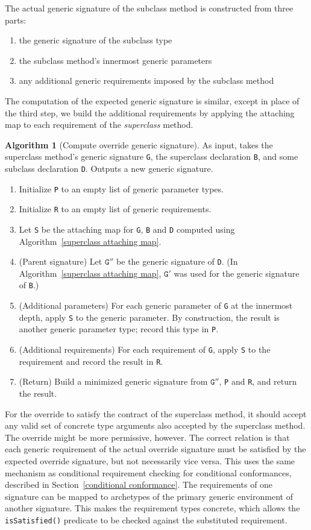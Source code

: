 \documentclass[a4paper,headsepline,bibliography=totoc,toc=flat,fleqn,twoside=semi]{scrbook}
\theoremstyle{definition}
\theoremstyle{definition}
\theoremstyle{definition}
\newtheorem{algorithm}{Algorithm}[chapter]
\begin{document}
The actual generic signature of the subclass method is constructed from three parts:
\begin{enumerate}
\item the generic signature of the subclass type
\item the subclass method's innermost generic parameters
\item any additional generic requirements imposed by the subclass method
\end{enumerate}
The computation of the expected generic signature is similar, except in place of the third step, we build the additional requirements by applying the attaching map to each requirement of the \emph{superclass} method.
\begin{algorithm}[Compute override generic signature] As input, takes the superclass method's generic signature \texttt{G}, the superclass declaration \texttt{B}, and some subclass declaration \texttt{D}. Outputs a new generic signature.
\begin{enumerate}
\item Initialize \texttt{P} to an empty list of generic parameter types.
\item Initialize \texttt{R} to an empty list of generic requirements.
\item Let \texttt{S} be the attaching map for \texttt{G}, \texttt{B} and \texttt{D} computed using Algorithm~\ref{superclass attaching map}.
\item (Parent signature) Let $\texttt{G}''$ be the generic signature of \texttt{D}. (In Algorithm~\ref{superclass attaching map}, $\texttt{G}'$ was used for the generic signature of \texttt{B}.)
\item (Additional parameters) For each generic parameter of \texttt{G} at the innermost depth, apply \texttt{S} to the generic parameter. By construction, the result is another generic parameter type; record this type in \texttt{P}.
\item (Additional requirements) For each requirement of \texttt{G}, apply \texttt{S} to the requirement and record the result in \texttt{R}.
\item (Return) Build a minimized generic signature from $\texttt{G}''$, \texttt{P} and \texttt{R}, and return the result.
\end{enumerate}
\end{algorithm}

For the override to satisfy the contract of the superclass method, it should accept any valid set of concrete type arguments also accepted by the superclass method. The override might be more permissive, however. The correct relation is that each generic requirement of the actual override signature must be satisfied by the expected override signature, but not necessarily vice versa. This uses the same mechanism as conditional requirement checking for conditional conformances, described in Section~\ref{conditional conformance}. The requirements of one signature can be mapped to archetypes of the primary generic environment of another signature. This makes the requirement types concrete, which allows the \texttt{isSatisfied()} predicate to be checked against the substituted requirement.
\end{document}
